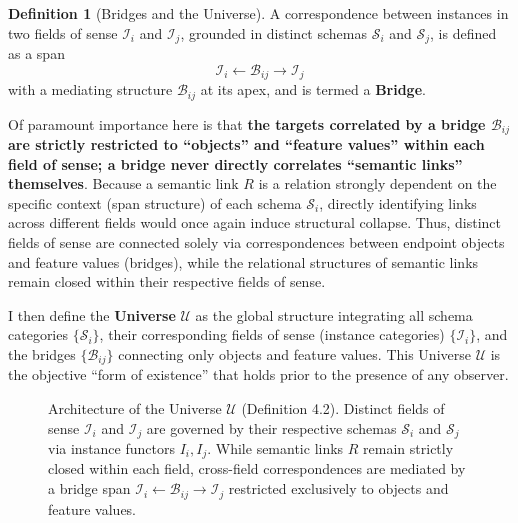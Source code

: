 \documentclass[11pt,a4paper]{article}
\theoremstyle{definition}
\newtheorem{definition}{Definition}[section]
\theoremstyle{plain}
\begin{document}
\begin{definition}[Bridges and the Universe]
A correspondence between instances in two fields of sense $\mathcal{I}_{i}$ and $\mathcal{I}_{j}$, grounded in distinct schemas $\mathcal{S}_{i}$ and $\mathcal{S}_{j}$, is defined as a span \cite{fong2019}
\begin{equation*}
\mathcal{I}_i \leftarrow \mathcal{B}_{ij} \rightarrow \mathcal{I}_j
\end{equation*}
with a mediating structure $\mathcal{B}_{ij}$ at its apex, and is termed a \textbf{Bridge}.
\end{definition}

Of paramount importance here is that \textbf{the targets correlated by a bridge $\mathcal{B}_{ij}$ are strictly restricted to ``objects'' and ``feature values'' within each field of sense; a bridge never directly correlates ``semantic links'' themselves}. Because a semantic link $R$ is a relation strongly dependent on the specific context (span structure) of each schema $\mathcal{S}_{i}$, directly identifying links across different fields would once again induce structural collapse. Thus, distinct fields of sense are connected solely via correspondences between endpoint objects and feature values (bridges), while the relational structures of semantic links remain closed within their respective fields of sense.

I then define the \textbf{Universe} $\mathcal{U}$ as the global structure integrating all schema categories $\{\mathcal{S}_i\}$, their corresponding fields of sense (instance categories) $\{\mathcal{I}_i\}$, and the bridges $\{\mathcal{B}_{ij}\}$ connecting only objects and feature values. This Universe $\mathcal{U}$ is the objective ``form of existence'' that holds prior to the presence of any observer.

\begin{figure}[htbp]
\centering
{}
\caption{Architecture of the Universe $\mathcal{U}$ (Definition 4.2). Distinct fields of sense $\mathcal{I}_i$ and $\mathcal{I}_j$ are governed by their respective schemas $\mathcal{S}_i$ and $\mathcal{S}_j$ via instance functors $I_i, I_j$. While semantic links $R$ remain strictly closed within each field, cross-field correspondences are mediated by a bridge span $\mathcal{I}_i \leftarrow \mathcal{B}_{ij} \rightarrow \mathcal{I}_j$ restricted exclusively to objects and feature values.}
\label{fig:universe_bridge}
\end{figure}
\end{document}
